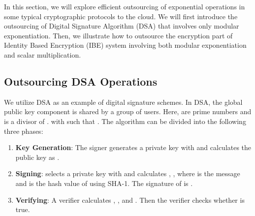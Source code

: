 \documentclass[english,draftcls,onecolumn,11pt]{IEEEtran}
\theoremstyle{definition}
\theoremstyle{plain}
\theoremstyle{plain}
\theoremstyle{definition}
\begin{document}
In this section, we will explore efficient outsourcing of exponential
operations in some typical cryptographic protocols to the cloud. We
will first introduce the outsourcing of Digital Signature Algorithm
(DSA) that involves only modular exponentiation. Then, we illustrate
how to outsource the encryption part of Identity Based Encryption
(IBE) system involving both modular exponentiation and scalar multiplication. 


\subsection{Outsourcing DSA Operations}

We utilize DSA \cite{william2003} as an example of digital signature
schemes. In DSA, the global public key component  is shared
by a group of users. Here,  are prime numbers and  is a
divisor of .  with  such
that . The algorithm can be divided into the
following three phases:
\begin{enumerate}
\item \textbf{Key Generation}: The signer  generates a private key 
with  and calculates the public key as .
\item \textbf{Signing}:  selects a private key  with  and
calculates , ,
where  is the message and  is the hash value of  using
SHA-1. The signature of  is .
\item \textbf{Verifying}: A verifier  calculates ,
,  and .
Then the verifier checks whether  is true.
\end{enumerate}
\end{document}
